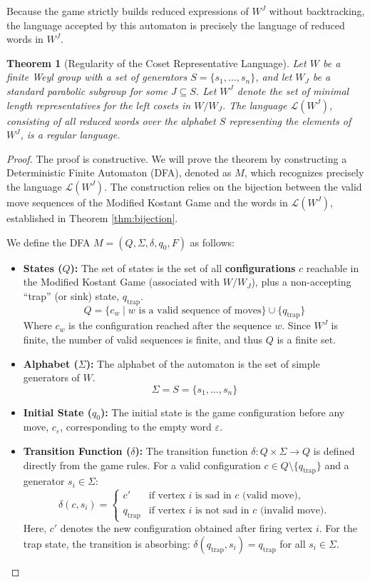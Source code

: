 \documentclass[11pt,a4paper]{amsart}
\theoremstyle{plain}
\newtheorem{theorem}{Theorem}[section]
\theoremstyle{definition}
\theoremstyle{remark}
\begin{document}
Because the game strictly builds reduced expressions of $W^J$ without backtracking, the language accepted by this automaton is precisely the language of reduced words in $W^J$.

\begin{theorem}[Regularity of the Coset Representative Language]
	Let $W$ be a finite Weyl group with a set of generators $S = \{s_1, \dots, s_n\}$, and let $W_J$ be a standard parabolic subgroup for some $J \subseteq S$. Let $W^J$ denote the set of minimal length representatives for the left cosets in $W/W_J$. The language $\mathcal{L}(W^J)$, consisting of all reduced words over the alphabet $S$ representing the elements of $W^J$, is a regular language.
\end{theorem}

\begin{proof}
	The proof is constructive. We will prove the theorem by constructing a Deterministic Finite Automaton (DFA), denoted as $M$, which recognizes precisely the language $\mathcal{L}(W^J)$. The construction relies on the bijection between the valid move sequences of the Modified Kostant Game and the words in $\mathcal{L}(W^J)$, established in Theorem \ref{thm:bijection}.
	
	We define the DFA $M = (Q, \Sigma, \delta, q_0, F)$ as follows:
	
	\begin{itemize}
		\item \textbf{States ($Q$):} The set of states is the set of all \textbf{configurations} $c$ reachable in the Modified Kostant Game (associated with $W/W_J$), plus a non-accepting ``trap'' (or sink) state, $q_{\text{trap}}$.
		$$ Q = \{ c_w \mid w \text{ is a valid sequence of moves} \} \cup \{q_{\text{trap}}\} $$
		Where $c_w$ is the configuration reached after the sequence $w$. Since $W^J$ is finite, the number of valid sequences is finite, and thus $Q$ is a finite set.
		
		\item \textbf{Alphabet ($\Sigma$):} The alphabet of the automaton is the set of simple generators of $W$.
		$$ \Sigma = S = \{s_1, \dots, s_n\} $$
		
		\item \textbf{Initial State ($q_0$):} The initial state is the game configuration before any move, $c_{\varepsilon}$, corresponding to the empty word $\varepsilon$.
		
		\item \textbf{Transition Function ($\delta$):} The transition function $\delta: Q \times \Sigma \to Q$ is defined directly from the game rules. For a valid configuration $c \in Q \setminus \{q_{\text{trap}}\}$ and a generator $s_i \in \Sigma$:
		$$ \delta(c, s_i) =
		\begin{cases}
			c' & \text{if vertex } i \text{ is sad in } c \text{ (valid move)}, \\
			q_{\text{trap}} & \text{if vertex } i \text{ is not sad in } c \text{ (invalid move)}.
		\end{cases}
		$$
		Here, $c'$ denotes the new configuration obtained after firing vertex $i$. For the trap state, the transition is absorbing: $\delta(q_{\text{trap}}, s_i) = q_{\text{trap}}$ for all $s_i \in \Sigma$.
		

\end{itemize}
\end{proof}
\end{document}

